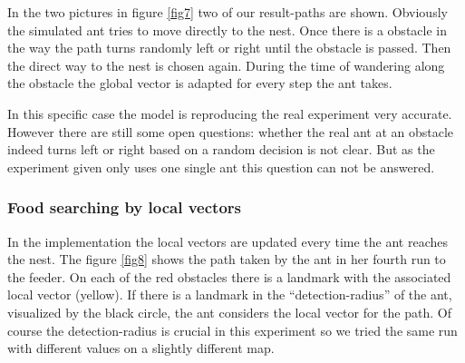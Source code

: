 \documentclass[11pt]{article}
\begin{document}
In the two pictures in figure \ref{fig7} two of our result-paths are shown. Obviously the simulated ant tries to move directly to the nest. Once there is a obstacle in the way the path turns randomly left or right until the obstacle is passed. Then the direct way to the nest is chosen again. During the time of wandering along the obstacle the global vector is adapted for every step the ant takes.

In this specific case the model is reproducing the real experiment very accurate. However there are still some open questions: whether the real ant at an obstacle indeed turns left or right based on a random decision is not clear. But as the experiment given only uses one single ant this question can not be answered.

\subsubsection{Food searching by local vectors}
In the implementation the local vectors are updated every time the ant reaches the nest. The figure \ref{fig8} shows the path taken by the ant in her fourth run to the feeder. On each of the red obstacles there is a landmark with the associated local vector (yellow). If there is a landmark in the “detection-radius” of the ant, visualized by the black circle, the ant considers the local vector for the path. Of course the detection-radius is crucial in this experiment so we tried the same run with different values on a slightly different map.
\end{document}
